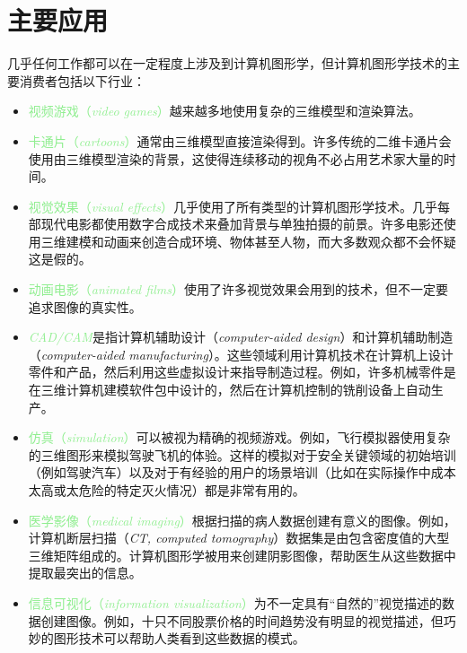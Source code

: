 \documentclass[lang=cn,12pt]{elegantbook}
\begin{document}
\section{主要应用}

几乎任何工作都可以在一定程度上涉及到计算机图形学，但计算机图形学技术的主要消费者包括以下行业：

\begin{itemize}
  \item \textcolor{lightgreen}{视频游戏（\textit{video games}）}越来越多地使用复杂的三维模型和渲染算法。
  \item \textcolor{lightgreen}{卡通片（\textit{cartoons}）}通常由三维模型直接渲染得到。许多传统的二维卡通片会使用由三维模型渲染的背景，这使得连续移动的视角不必占用艺术家大量的时间。
  \item \textcolor{lightgreen}{视觉效果（\textit{visual effects}）}几乎使用了所有类型的计算机图形学技术。几乎每部现代电影都使用数字合成技术来叠加背景与单独拍摄的前景。许多电影还使用三维建模和动画来创造合成环境、物体甚至人物，而大多数观众都不会怀疑这是假的。
  \item \textcolor{lightgreen}{动画电影（\textit{animated films}）}使用了许多视觉效果会用到的技术，但不一定要追求图像的真实性。
  \item \textcolor{lightgreen}{\textit{CAD/CAM}}是指计算机辅助设计（\textit{computer-aided design}）和计算机辅助制造（\textit{computer-aided manufacturing}）。这些领域利用计算机技术在计算机上设计零件和产品，然后利用这些虚拟设计来指导制造过程。例如，许多机械零件是在三维计算机建模软件包中设计的，然后在计算机控制的铣削设备上自动生产。
  \item \textcolor{lightgreen}{仿真（\textit{simulation}）}可以被视为精确的视频游戏。例如，飞行模拟器使用复杂的三维图形来模拟驾驶飞机的体验。这样的模拟对于安全关键领域的初始培训（例如驾驶汽车）以及对于有经验的用户的场景培训（比如在实际操作中成本太高或太危险的特定灭火情况）都是非常有用的。
  \item \textcolor{lightgreen}{医学影像（\textit{medical imaging}）}根据扫描的病人数据创建有意义的图像。例如，计算机断层扫描（\textit{CT, computed tomography}）数据集是由包含密度值的大型三维矩阵组成的。计算机图形学被用来创建阴影图像，帮助医生从这些数据中提取最突出的信息。
  \item \textcolor{lightgreen}{信息可视化（\textit{information visualization}）}为不一定具有“自然的”视觉描述的数据创建图像。例如，十只不同股票价格的时间趋势没有明显的视觉描述，但巧妙的图形技术可以帮助人类看到这些数据的模式。
\end{itemize}
\end{document}
